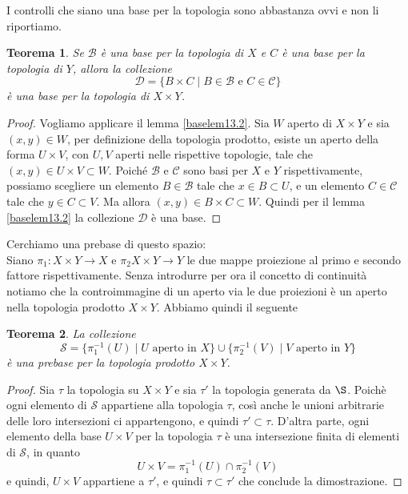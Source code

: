 \documentclass[10pt,a4paper]{article}
\theoremstyle{definition}
\theoremstyle{plain}
\newtheorem{teo}{Teorema}
\theoremstyle{remark}
\theoremstyle{remark}
\newcommand{\C}{\mathcal{C}}
\newcommand{\B}{\mathcal{B}}
\newcommand{\D}{\mathcal{D}}
\newcommand{\Ss}{\mathcal{S}}
\begin{document}
I controlli che siano una base per la topologia sono abbastanza ovvi e non li riportiamo. \\
\begin{teo} Se $\B$ è una base per la topologia di $X$ e $C$ è una base per la topologia di $Y$, allora la collezione \[ \D = \lbrace B \times C \mid  B \in \B \text{ e } C \in \C \rbrace \] è una base per la topologia di $X \times Y$.
\end{teo}
\begin{proof}
Vogliamo applicare il lemma \ref{baselem13.2}. Sia $W$ aperto di $X \times Y$ e sia $(x,y) \in W$, per definizione della topologia prodotto, esiste un aperto della forma $U \times V$, con $U,V$ aperti nelle rispettive topologie, tale che $(x,y) \in U \times V \subset W$. Poiché $\B$ e $\C$ sono basi per $X$ e $Y$ rispettivamente, possiamo scegliere un elemento $B \in \B$ tale che $x \in B \subset U$, e un elemento $C \in \C$ tale che $y \in C \subset V$. Ma allora $(x,y) \in B \times C \subset W$. Quindi per il lemma \ref{baselem13.2} la collezione $\D$ è una base. 
\end{proof}

Cerchiamo una prebase di questo spazio:\\
Siano $\pi_1 : X \times Y \to X$ e $\pi_2X \times Y \to Y$ le due mappe proiezione al primo e secondo fattore rispettivamente. Senza introdurre per ora il concetto di continuità notiamo che la controimmagine di un aperto via le due proiezioni è un aperto nella topologia prodotto $X \times Y$. Abbiamo quindi il seguente 

\begin{teo} La collezione \[ \Ss = \lbrace \pi_1^{-1}(U) \mid U \text{ aperto in } X \rbrace \cup \lbrace \pi_2^{-1}(V)\mid V \text{ aperto in } Y \rbrace \] è una prebase per la topologia prodotto $X \times Y$.
\end{teo}

\begin{proof}


Sia $\tau$ la topologia su $X \times Y$ e sia $\tau'$ la topologia generata da $\S$. Poichè ogni elemento di $\Ss$ appartiene alla topologia $\tau$, così anche le unioni arbitrarie delle loro intersezioni ci appartengono, e quindi $\tau' \subset \tau$. D'altra parte, ogni elemento della base $U \times V$ per la topologia $\tau$ è una intersezione finita di elementi di $\Ss$, in quanto \[ U \times V = \pi_1^{-1}(U) \cap \pi_2^{-1}(V) \] e quindi, $U \times V$ appartiene a $\tau'$, e quindi $\tau \subset \tau'$ che conclude la dimostrazione.
\end{proof}
\end{document}

